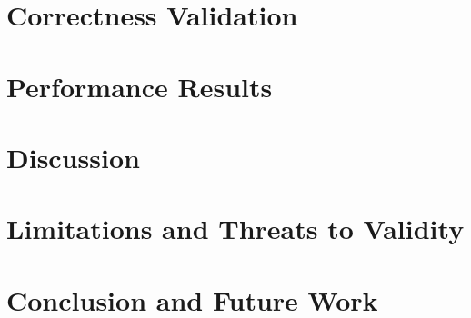\documentclass{cs259}
\begin{document}
\section{Correctness Validation}


\section{Performance Results}


\section{Discussion}


\section{Limitations and Threats to Validity}\label{sec:limits}


\section{Conclusion and Future Work}


\renewcommand{\csReferencesIntro}{%
  \noindent\emph{Original material.} All figures and tables in this paper were created by the author for this paper from the
  project's own measurements, source code, and calculations; none is copied or adapted from another publication. The data figures
  are generated by scripts from the raw measurements, and the diagrams (workload flow chart, execution architecture, and hybrid time line)
  were drawn by the author. The source code (serial, OpenMP, CUDA, and hybrid implementations, benchmark harness, and analysis scripts),
  the raw measurements, and the report source are the author's own work and are listed as reference~\cite{induru2026repository}.
  All other entries are published works cited in the text. The references follow the IEEE style; as the course template requires,
  they are numbered and ordered alphabetically by first author.\par\smallskip}



\end{document}
